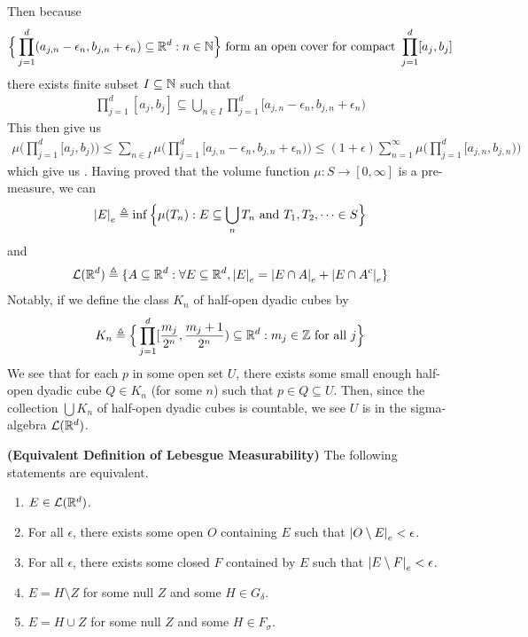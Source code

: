\documentclass{report}
\begin{document}
\begin{mdframed}
Then because  
\begin{align*}
\Big\{ \prod_{j=1}^d (a_{j,n}-\epsilon_n , b_{j,n}+\epsilon_n )\subseteq \mathbb{R}^d:n\in\mathbb{N} \Big\}\text{ form an open cover for compact }\prod_{j=1}^d [a_j,b_j]
\end{align*}
there exists finite subset $I \subseteq \mathbb{N}$ such that 
\begin{align*}
\prod_{j=1}^d [a_j,b_j]\subseteq \bigcup_{n \in I} \prod_{j=1}^d [a_{j,n}-\epsilon _n, b_{j,n}+\epsilon _n)
\end{align*}
This then give us 
\begin{align*}
\mu \Big(\prod_{j=1}^d [a_j,b_j)\Big)\leq \sum_{n \in I}\mu \Big(\prod_{j=1}^d [a_{j,n}-\epsilon _n, b_{j,n}+\epsilon _n) \Big) \leq (1+\epsilon )\sum_{n=1}^{\infty} \mu \Big(\prod_{j=1}^d [a_{j,n},b_{j,n}) \Big)
\end{align*}
which give us . Having proved that the volume function $\mu : S\rightarrow [0,\infty]$ is a pre-measure, we can 
\begin{align*}
\left|E\right|_e \triangleq \inf \Big\{  \mu (T_n) : E \subseteq \bigcup_ n T_n \text{ and }T_1,T_2,\dots  \in S \Big\}
\end{align*}
and  
\begin{align*}
\mathcal{L}(\mathbb{R}^d)\triangleq \{ A \subseteq \mathbb{R}^d: \forall E \subseteq \mathbb{R}^d, \left|E\right|_e= \left|E\cap A\right|_e + \left|E\cap A^c\right|_e \}
\end{align*}
Notably, if we define the class $K_n$ of half-open dyadic cubes by 
\begin{align*}
K_n \triangleq \Big\{ \prod_{j=1}^{d} [\frac{m_j}{2^n}, \frac{m_j+1}{2^n})\subseteq \mathbb{R}^d: m_j \in\mathbb{Z} \text{ for all }j \Big\}
\end{align*}
We see that for each $p$ in some open set $U$, there exists some small enough half-open dyadic cube $Q\in K_n$ (for some $n$) such that $p \in Q \subseteq U$. Then, since the collection $\bigcup K_n$ of half-open dyadic cubes is countable, we see $U$ is in the sigma-algebra  $\mathcal{L}(\mathbb{R}^d)$. 
\end{mdframed}
\begin{theorem}
\label{Equivalent Definition of Lebesgue Measurability}
\textbf{(Equivalent Definition of Lebesgue Measurability)} The following statements are equivalent. 
\begin{enumerate}[label=(\alph*)]
  \item $E\in \mathcal{L}(\mathbb{R}^d)$. 
  \item For all $\epsilon $, there exists some open $O$ containing $E$ such that  $\left|O\setminus E\right|_e< \epsilon $. 
  \item For all $\epsilon $, there exists some closed $F$ contained by $E$ such that $\left|E\setminus F\right|_e<\epsilon $. 
  \item $E= H \setminus Z$ for some null $Z$ and some $H \in G_\delta$.  
  \item $E=H \cup Z$ for some null $Z$ and some $H\in F_\sigma$. 
\end{enumerate}
\end{theorem}
\end{document}

